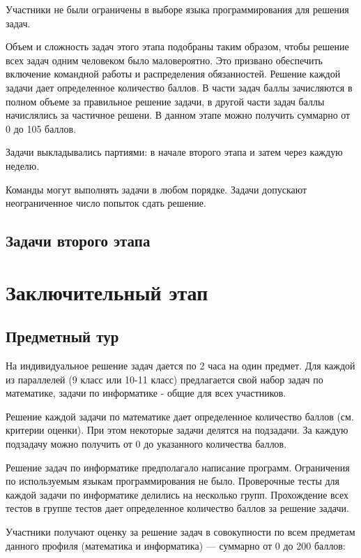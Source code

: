 \documentclass[a4paper,12pt,oneside]{book}
\begin{document}
Участники не были ограничены в выборе языка программирования для решения задач.

Объем и сложность задач этого этапа подобраны таким образом, чтобы решение всех задач одним человеком было маловероятно. Это призвано обеспечить включение командной работы и распределения обязанностей. Решение каждой задачи дает определенное количество баллов. В части задач баллы зачисляются в полном объеме за правильное решение задачи, в другой части задач баллы начислялись за частичное решени. В данном этапе можно получить суммарно от 0 до 105 баллов.

Задачи выкладывались партиями: в начале второго этапа и затем через каждую неделю.

Команды могут выполнять задачи в любом порядке. Задачи допускают неограниченное число попыток сдать решение.

\clearpage
\chapter{Задачи второго этапа}


\part{Заключительный этап}
 
\clearpage
\chapter{Предметный тур}

На индивидуальное решение задач дается по 2 часа на один предмет.
Для каждой из параллелей (9 класс или 10-11 класс) предлагается свой
набор задач по математике, задачи по информатике - общие для всех
участников.

Решение каждой задачи по математике дает определенное количество
баллов (см. критерии оценки). При этом некоторые задачи делятся на
подзадачи. За каждую подзадачу можно получить от 0 до указанного
количества баллов.

Решение задач по информатике предполагало написание программ.
Ограничения по используемым языкам программирования не было.
Проверочные тесты для каждой задачи по информатике делились на
несколько групп. Прохождение всех тестов в группе тестов дает
определенное количество баллов за решение задачи.

Участники получают оценку за решение задач в совокупности по
всем предметам данного профиля (математика и информатика) ---
суммарно от 0 до 200 баллов:
\end{document}
